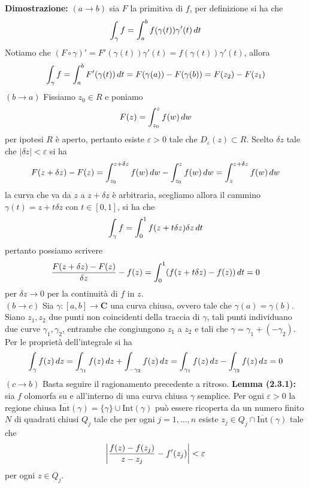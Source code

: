 \documentclass{article}
\begin{document}
\textbf{Dimostrazione:} $(a \rightarrow b)$ sia $F$ la primitiva di $f$, per definizione si ha che
\begin{gather}
    \int_\gamma f = \int_a^b f(\gamma(t))\gamma'(t) \, dt \notag
\end{gather}
Notiamo che $(F \circ \gamma)' = F'(\gamma(t))\gamma'(t) = f(\gamma(t))\gamma'(t)$, allora
\begin{gather}
    \int_\gamma f = \int_a^b F'(\gamma(t)) \, dt = F(\gamma(a)) - F(\gamma(b)) = F(z_2) - F(z_1) \notag
\end{gather}
$(b \rightarrow a)$ Fissiamo $z_0 \in R$ e poniamo
\begin{gather}
    F(z) = \int_{z_0}^z f(w) \, dw \notag
\end{gather}
per ipotesi $R$ è aperto, pertanto esiste $\varepsilon > 0$ tale che $D_\varepsilon(z) \subset R$. Scelto $\delta z$ tale che $|\delta z| < \varepsilon$ si ha
\begin{gather}
    F(z + \delta z) - F(z) = \int_{z_0}^{z + \delta z}f(w) \, dw - \int_{z_0}^zf(w) \, dw = \int_z^{z + \delta z}f(w) \, dw \notag
\end{gather}
la curva che va da $z$ a $z + \delta z$ è arbitraria, scegliamo allora il cammino $\gamma(t) = z + t\delta z$ con $t \in [0, 1]$, si ha che
\begin{gather}
    \int_\gamma f = \int_0^1 f(z + t\delta z)\delta z \, dt \notag
\end{gather}
pertanto possiamo scrivere
\begin{gather}
    \frac{F(z + \delta z) - F(z)}{\delta z} - f(z) = \int_0^1(f(z + t\delta z) - f(z)) \, dt = 0 \notag
\end{gather}
per $\delta z \rightarrow 0$ per la continuità di $f$ in $z$. \\
$(b \rightarrow c)$ Sia $\gamma : [a, b] \longrightarrow \mathbf{C}$ una curva chiusa, ovvero tale che $\gamma(a) = \gamma(b)$. Siano $z_1, z_2$ due punti non coincidenti della traccia di $\gamma$, tali punti individuano due curve $\gamma_1, \gamma_2$, entrambe che congiungono $z_1$ a $z_2$ e tali che $\gamma = \gamma_1 + (-\gamma_2)$. Per le proprietà dell'integrale si ha
\begin{gather}
    \int_\gamma f(z) \, dz = \int_{\gamma_1} f(z) \, dz + \int_{-\gamma_2} f(z) \, dz = \int_{\gamma_1} f(z) \, dz - \int_{\gamma_2} f(z) \, dz = 0 \notag
\end{gather}
$(c \rightarrow b)$ Basta seguire il ragionamento precedente a ritroso.
\newpage
\textbf{Lemma (2.3.1):} sia $f$ olomorfa su e all'interno di una curva chiusa $\gamma$ semplice. Per ogni $\varepsilon > 0$ la regione chiusa $\overline{\mathrm{Int}}(\gamma) = \{\gamma\} \cup \mathrm{Int}(\gamma)$ può essere ricoperta da un numero finito $N$ di quadrati chiusi $Q_j$ tale che per ogni $j = 1, \dots, n$ esiste $z_j \in Q_j \cap \overline{\mathrm{Int}}(\gamma)$ tale che
\begin{gather}
    \left|\frac{f(z) - f(z_j)}{z - z_j} - f'(z_j)\right| < \varepsilon \notag
\end{gather}
per ogni $z \in Q_j$. \\
\end{document}
